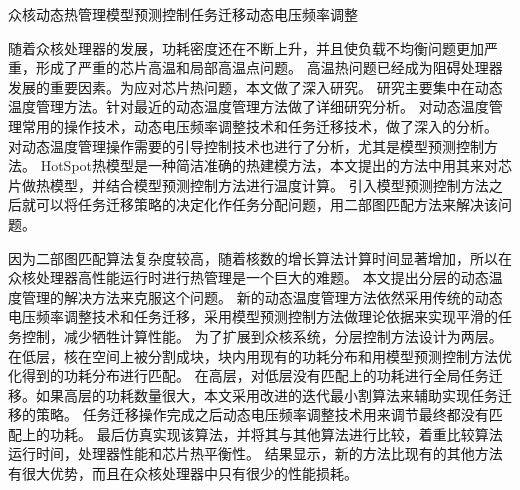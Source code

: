 
\begin{Cabstract}{众核}{动态热管理}{模型预测控制}{任务迁移}{动态电压频率调整}

随着众核处理器的发展，功耗密度还在不断上升，并且使负载不均衡问题更加严重，形成了严重的芯片高温和局部高温点问题。
高温热问题已经成为阻碍处理器发展的重要因素。为应对芯片热问题，本文做了深入研究。
研究主要集中在动态温度管理方法。针对最近的动态温度管理方法做了详细研究分析。
对动态温度管理常用的操作技术，动态电压频率调整技术和任务迁移技术，做了深入的分析。
对动态温度管理操作需要的引导控制技术也进行了分析，尤其是模型预测控制方法。
HotSpot热模型是一种简洁准确的热建模方法，本文提出的方法中用其来对芯片做热模型，并结合模型预测控制方法进行温度计算。
引入模型预测控制方法之后就可以将任务迁移策略的决定化作任务分配问题，用二部图匹配方法来解决该问题。

因为二部图匹配算法复杂度较高，随着核数的增长算法计算时间显著增加，所以在众核处理器高性能运行时进行热管理是一个巨大的难题。
本文提出分层的动态温度管理的解决方法来克服这个问题。
新的动态温度管理方法依然采用传统的动态电压频率调整技术和任务迁移，采用模型预测控制方法做理论依据来实现平滑的任务控制，减少牺牲计算性能。
为了扩展到众核系统，分层控制方法设计为两层。
在低层，核在空间上被分割成块，块内用现有的功耗分布和用模型预测控制方法优化得到的功耗分布进行匹配。
在高层，对低层没有匹配上的功耗进行全局任务迁移。如果高层的功耗数量很大，本文采用改进的迭代最小割算法来辅助实现任务迁移的策略。
任务迁移操作完成之后动态电压频率调整技术用来调节最终都没有匹配上的功耗。
最后仿真实现该算法，并将其与其他算法进行比较，着重比较算法运行时间，处理器性能和芯片热平衡性。
结果显示，新的方法比现有的其他方法有很大优势，而且在众核处理器中只有很少的性能损耗。
\end{Cabstract}
